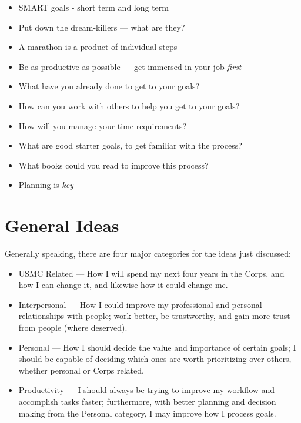 \begin{itemize}
\item{SMART goals - short term and long term}
\item{Put down the dream-killers --- what are they?}
\item{A marathon is a product of individual steps}
\item{Be as productive as possible --- get immersed in your job \textit{first}}
\item{What have you already done to get to your goals?}
\item{How can you work with others to help you get to your goals?}
\item{How will you manage your time requirements?}
\item{What are good starter goals, to get familiar with the process?}
\item{What books could you read to improve this process?}
\item{Planning is \textit{key}}
\end{itemize}

\section{General Ideas}

Generally speaking, there are four major categories for the ideas just discussed:

\begin{itemize}
\item USMC Related --- How I will spend my next four years in the Corps, and how I can change it, and likewise
  how it could change me.
\item Interpersonal --- How I could improve my professional and personal relationships with people; work better,
  be trustworthy, and gain more trust from people (where deserved).
\item Personal --- How I should decide the value and importance of certain goals; I should be capable of deciding
  which ones are worth prioritizing over others, whether personal or Corps related.
\item Productivity --- I should always be trying to improve my workflow and accomplish tasks faster; furthermore,
  with better planning and decision making from the Personal category, I may improve how I process goals.
\end{itemize}
